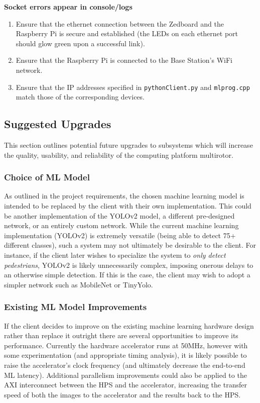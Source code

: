 \documentclass[10pt,letterpaper]{article}
\begin{document}
\textbf{Socket errors appear in console/logs}
\begin{enumerate}
\item Ensure that the ethernet connection between the Zedboard and the Raspberry Pi is secure and established (the LEDs on each ethernet port should glow green upon a successful link).
\item Ensure that the Raspberry Pi is connected to the Base Station's WiFi network.
\item Ensure that the IP addresses specified in \texttt{pythonClient.py} and \texttt{mlprog.cpp} match those of the corresponding devices.
\end{enumerate}

\clearpage
\subsection{Suggested Upgrades}
This section outlines potential future upgrades to subsystems which will increase the quality, usability, and reliability of the computing platform multirotor. 

\subsubsection{Choice of ML Model}
As outlined in the project requirements, the chosen machine learning model is intended to be replaced by the client with their own implementation. This could be another implementation of the YOLOv2 model, a different pre-designed network, or an entirely custom network. While the current machine learning implementation (YOLOv2) is extremely versatile (being able to detect 75+ different classes), such a system may not ultimately be desirable to the client. For instance, if the client later wishes to specialize the system to \textit{only detect pedestrians}, YOLOv2 is likely unnecessarily complex, imposing onerous delays to an otherwise simple detection. If this is the case, the client may wish to adopt a simpler network such as MobileNet or TinyYolo.

\subsubsection{Existing ML Model Improvements}
If the client decides to improve on the existing machine learning hardware design rather than replace it outright there are several opportunities to improve its performance. Currently the hardware accelerator runs at 50MHz, however with some experimentation (and appropriate timing analysis), it is likely possible to raise the accelerator's clock frequency (and ultimately decrease the end-to-end ML latency). Additional parallelism improvements could also be applied to the AXI interconnect between the HPS and the accelerator, increasing the transfer speed of both the images to the accelerator and the results back to the HPS.
\end{document}
